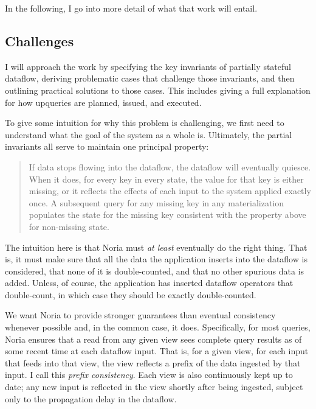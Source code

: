 \documentclass[fontsize=12pt,paper=letter]{scrartcl}
\begin{document}
In the following, I go into more detail of what that work will entail.

\subsection{Challenges}
\label{s:challenges}

I will approach the work by specifying the key invariants of partially stateful
dataflow, deriving problematic cases that challenge those invariants, and then
outlining practical solutions to those cases. This includes giving a full
explanation for how upqueries are planned, issued, and executed.

To give some intuition for why this problem is challenging, we first need to
understand what the goal of the system as a whole is. Ultimately, the partial
invariants all serve to maintain one principal property:

\begin{quote}
	If data stops flowing into the dataflow, the dataflow will eventually
	quiesce. When it does, for every key in every state, the value for that
	key is either missing, or it reflects the effects of each input to the
	system applied exactly once. A subsequent query for any missing key in
	any materialization populates the state for the missing key consistent
	with the property above for non-missing state.
\end{quote}

The intuition here is that Noria must \emph{at least} eventually do the right
thing. That is, it must make sure that all the data the application inserts into
the dataflow is considered, that none of it is double-counted, and that no other
spurious data is added. Unless, of course, the application has inserted dataflow
operators that double-count, in which case they should be exactly
double-counted.

We want Noria to provide stronger guarantees than eventual consistency whenever
possible and, in the common case, it does. Specifically, for most queries, Noria
ensures that a read from any given view sees complete query results as of some
recent time at each dataflow input. That is, for a given view, for each input
that feeds into that view, the view reflects a prefix of the data ingested by
that input. I call this \emph{prefix consistency}. Each view is also
continuously kept up to date; any new input is reflected in the view shortly
after being ingested, subject only to the propagation delay in the dataflow.
\end{document}
